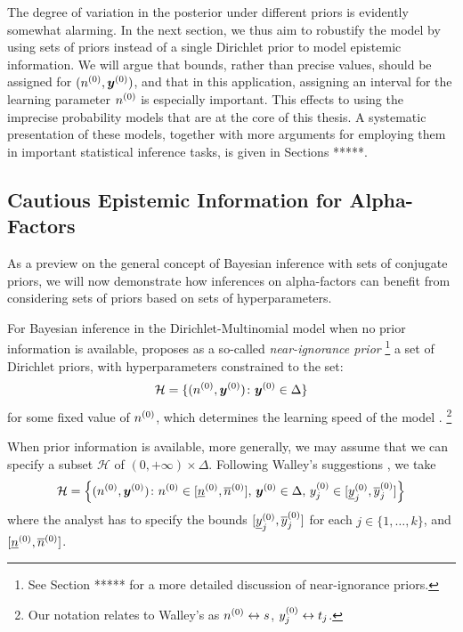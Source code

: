The degree of variation in the posterior under different priors is evidently somewhat alarming.
In the next section, we thus aim to robustify the model by using sets of priors
instead of a single Dirichlet prior to model epistemic information.
We will argue that bounds, rather than precise values,
should be assigned for $(n^{(0)},{\bm y}^{(0)})$, and that in this application,
assigning an interval for the learning parameter $n^{(0)}$ is especially important.
This effects to using the imprecise probability models that are at the core of this thesis.
A systematic presentation of these models,
together with more arguments for employing them in important statistical inference tasks,
is given in Sections *****.


\subsection{Cautious Epistemic Information for Alpha-Factors}
\label{sec:imprecise-alpha}

As a preview on the general concept of Bayesian inference with sets of conjugate priors,
we will now demonstrate how inferences on alpha-factors can benefit from
considering sets of priors based on sets of hyperparameters.

For Bayesian inference in the Dirichlet-Multinomial model
when no prior information is available,
\textcite{1996:walley::idm} proposes as a so-called \emph{near-ignorance prior}%
\footnote{See Section ***** for a more detailed discussion of near-ignorance priors.}
a set of Dirichlet priors,
with hyperparameters constrained to the set:
\begin{equation*}
  \mathcal{H}=\{(n^{(0)},{\bm y}^{(0)})\colon{\bm y}^{(0)}\in\Delta\}
\end{equation*}
for some fixed value of $n^{(0)}$, which determines the learning speed of the model
\parencites[p.~218, \S 5.3.2]{1991:walley}[p.~9, \S 2.3]{1996:walley::idm}.%
\footnote{Our notation relates to Walley's as $n^{(0)} \leftrightarrow s$, $y^{(0)}_j \leftrightarrow t_j$.}

When prior information is available, more generally,
we may assume that we can specify a subset $\mathcal{H}$ of $(0,+\infty)\times\Delta$.
Following Walley's suggestions
\parencites[p.~224, \S 5.4.3]{1991:walley}[p.~32, \S 6]{1996:walley::idm},
we take
\begin{equation}
  \label{eq:hyperparams:boxmodel}
  \mathcal{H}
  =
  \left\{
  (n^{(0)},{\bm y}^{(0)})
  \colon
  n^{(0)}\in[\underline{n}^{(0)},\overline{n}^{(0)}],\,
  {\bm y}^{(0)}\in\Delta,\,
  y^{(0)}_j\in[\underline{y}^{(0)}_j,\overline{y}^{(0)}_j]
  \right\}
\end{equation}
where the analyst has to specify the bounds
$[\underline{y}^{(0)}_j,\overline{y}^{(0)}_j]$ for each $j\in\{1,\dots,k\}$,
and $[\underline{n}^{(0)},\overline{n}^{(0)}]$.

